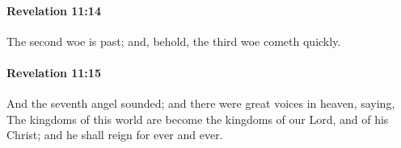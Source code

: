 		\paragraph{Revelation 11:14} %
			\label{REVELATIONNT-11-14}

			The second woe is past; and, behold, the third woe cometh quickly.

			\begin{framed}
			\scriptsize
				\begin{compactdesc}
					\item[SBLG] 
				\end{compactdesc}
			\end{framed}

		\paragraph{Revelation 11:15} %
			\label{REVELATIONNT-11-15}

			And the seventh angel sounded; and there were great voices in heaven, saying, The kingdoms of this world are become the kingdoms of our Lord, and of his Christ; and he shall reign for ever and ever.

